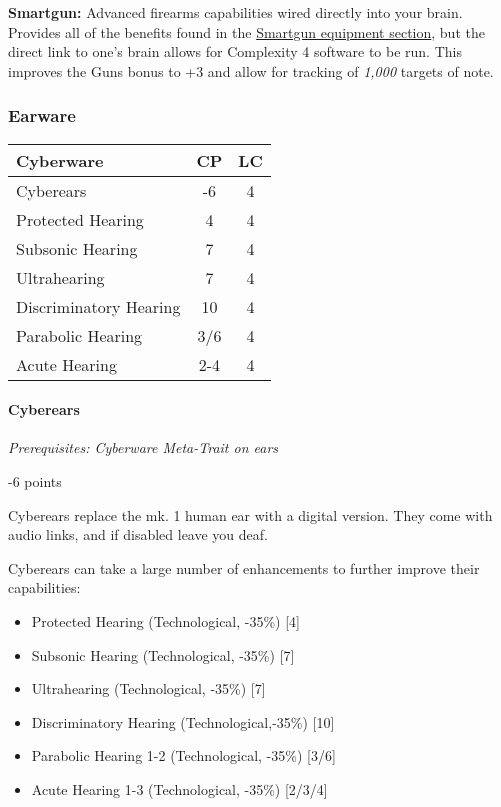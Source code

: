 \begin{multicols*}{3}
	\textbf{Smartgun:} Advanced firearms capabilities wired directly into your brain. Provides all of the benefits found in the \hyperref[smartgun]{Smartgun equipment section}, but the direct link to one's brain allows for Complexity 4 software to be run. This improves the Guns bonus to +3 and allow for tracking of \textit{1,000} targets of note.
	
	\subsubsection{Earware}
	
	\begin{center}
		\begin{tabularx}{0.32\textwidth}{|X|c|c|}
			\hline
			Cyberware & CP & LC\\
			\hline
			\hline
			Cyberears & -6 & 4 \\
			\hline
			Protected Hearing & 4 & 4 \\
			Subsonic Hearing & 7 & 4 \\
			Ultrahearing & 7 & 4 \\
			Discriminatory Hearing & 10 & 4 \\
			Parabolic Hearing & 3/6 & 4 \\
			Acute Hearing & 2-4 & 4 \\
			\hline
		\end{tabularx}
	\end{center}
	
	\paragraph{Cyberears}
	\textit{Prerequisites: Cyberware Meta-Trait on ears}
	\begin{flushright}
		-6 points
	\end{flushright}
	
	Cyberears replace the mk. 1 human ear with a digital version. They come with audio links, and if disabled leave you deaf.
	
	Cyberears can take a large number of enhancements to further improve their capabilities: 
	
	\begin{itemize}
		\item Protected Hearing (Technological, -35\%) [4]
		\item Subsonic Hearing (Technological, -35\%) [7]
		\item Ultrahearing (Technological, -35\%) [7]
		\item Discriminatory Hearing (Technological,-35\%) [10]
		\item Parabolic Hearing 1-2 (Technological, -35\%) [3/6]
		\item Acute Hearing 1-3 (Technological, -35\%) [2/3/4]
	\end{itemize}
	

\end{multicols*}
